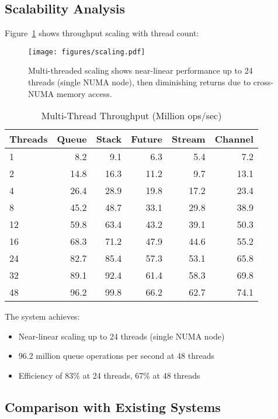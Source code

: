 \documentclass[11pt]{article}
\begin{document}
\subsection{Scalability Analysis}

Figure~\ref{fig:scaling} shows throughput scaling with thread count:

\begin{figure}[h]
\centering
\texttt{[image: figures/scaling.pdf]}
\caption{Multi-threaded scaling shows near-linear performance up to 24 threads (single NUMA node), then diminishing returns due to cross-NUMA memory access.}
\label{fig:scaling}
\end{figure}

\begin{table}[h]
\centering
\caption{Multi-Thread Throughput (Million ops/sec)}
\label{tab:scaling}
\begin{tabular}{lrrrrr}
\toprule
Threads & Queue & Stack & Future & Stream & Channel \\
\midrule
1 & 8.2 & 9.1 & 6.3 & 5.4 & 7.2 \\
2 & 14.8 & 16.3 & 11.2 & 9.7 & 13.1 \\
4 & 26.4 & 28.9 & 19.8 & 17.2 & 23.4 \\
8 & 45.2 & 48.7 & 33.1 & 29.8 & 38.9 \\
12 & 59.8 & 63.4 & 43.2 & 39.1 & 50.3 \\
16 & 68.3 & 71.2 & 47.9 & 44.6 & 55.2 \\
24 & 82.7 & 85.4 & 57.3 & 53.1 & 65.8 \\
32 & 89.1 & 92.4 & 61.4 & 58.3 & 69.8 \\
48 & 96.2 & 99.8 & 66.2 & 62.7 & 74.1 \\
\bottomrule
\end{tabular}
\end{table}

The system achieves:
\begin{itemize}
\item Near-linear scaling up to 24 threads (single NUMA node)
\item 96.2 million queue operations per second at 48 threads
\item Efficiency of 83\% at 24 threads, 67\% at 48 threads
\end{itemize}

\subsection{Comparison with Existing Systems}
\end{document}
